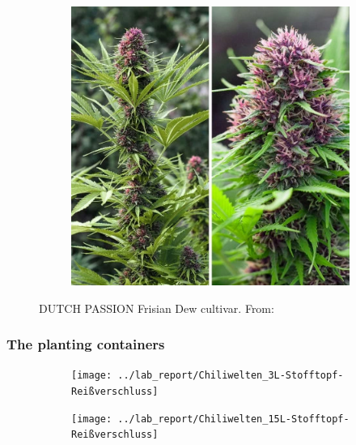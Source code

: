 \documentclass[12pt, aspectratio=1610]{beamer}
\begin{document}
\begin{frame}
\begin{figure}
\begin{subfigure}[t]{.48\textwidth}
                \includegraphics[width=\linewidth]{../lab_report/DUTCH-PASSION_Frisian-Dew_2}
            \end{subfigure}
            \caption{DUTCH PASSION Frisian Dew cultivar. From: \textcite{noauthor_dutch-passion_frisian-dew_nodate}}
        \end{figure}
    \end{frame}

    \begin{frame}
        \frametitle{The planting containers}
        \begin{figure}
            \begin{subfigure}[t]{.48\textwidth}
                \texttt{[image: ../lab\_report/Chiliwelten\_3L-Stofftopf-Reißverschluss]}
            \end{subfigure}
            \hfill
            \begin{subfigure}[t]{.48\textwidth}
                \texttt{[image: ../lab\_report/Chiliwelten\_15L-Stofftopf-Reißverschluss]}
            \end{subfigure}
        \end{figure}
    \end{frame}
\end{document}
